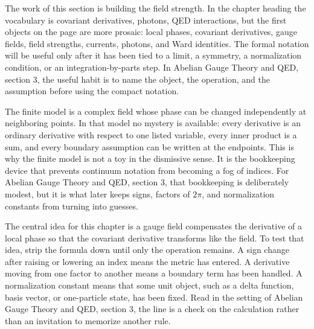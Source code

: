 











The work of this section is building the field strength.  In the chapter heading the vocabulary is covariant derivatives, photons, QED interactions, but the first objects on the page are more prosaic: local phases, covariant derivatives, gauge fields, field strengths, currents, photons, and Ward identities.  The formal notation will be useful only after it has been tied to a limit, a symmetry, a normalization condition, or an integration-by-parts step.  In Abelian Gauge Theory and QED, section 3, the useful habit is to name the object, the operation, and the assumption before using the compact notation.

The finite model is a complex field whose phase can be changed independently at neighboring points.  In that model no mystery is available: every derivative is an ordinary derivative with respect to one listed variable, every inner product is a sum, and every boundary assumption can be written at the endpoints.  This is why the finite model is not a toy in the dismissive sense.  It is the bookkeeping device that prevents continuum notation from becoming a fog of indices.  For Abelian Gauge Theory and QED, section 3, that bookkeeping is deliberately modest, but it is what later keeps signs, factors of \(2\pi\), and normalization constants from turning into guesses.

The central idea for this chapter is a gauge field compensates the derivative of a local phase so that the covariant derivative transforms like the field.  To test that idea, strip the formula down until only the operation remains.  A sign change after raising or lowering an index means the metric has entered.  A derivative moving from one factor to another means a boundary term has been handled.  A normalization constant means that some unit object, such as a delta function, basis vector, or one-particle state, has been fixed.  Read in the setting of Abelian Gauge Theory and QED, section 3, the line is a check on the calculation rather than an invitation to memorize another rule.

